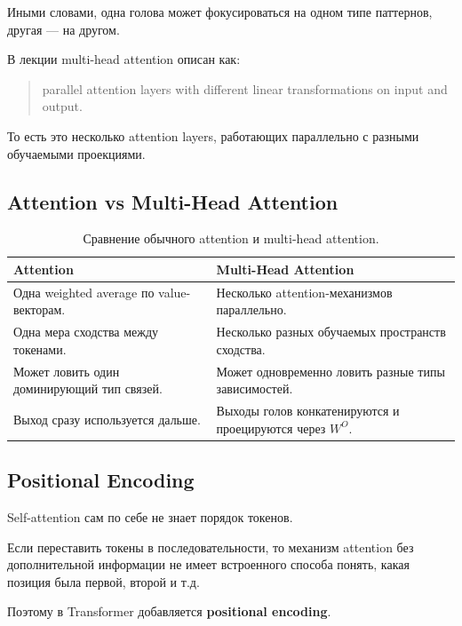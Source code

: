 \documentclass[a4paper,12pt]{article}
\begin{document}
Иными словами, одна голова может фокусироваться на одном типе паттернов, другая --- на другом.

В лекции multi-head attention описан как:

\begin{quote}
parallel attention layers with different linear transformations on input and output.
\end{quote}

То есть это несколько attention layers, работающих параллельно с разными обучаемыми проекциями.

\subsection{Attention vs Multi-Head Attention}

\begin{table}[H]
\centering
\begin{tabular}{p{} p{}}
\toprule
\textbf{Attention} & \textbf{Multi-Head Attention} \\
\midrule
Одна weighted average по value-векторам. &
Несколько attention-механизмов параллельно. \\

Одна мера сходства между токенами. &
Несколько разных обучаемых пространств сходства. \\

Может ловить один доминирующий тип связей. &
Может одновременно ловить разные типы зависимостей. \\

Выход сразу используется дальше. &
Выходы голов конкатенируются и проецируются через \(W^O\). \\
\bottomrule
\end{tabular}
\caption{Сравнение обычного attention и multi-head attention.}
\end{table}

\subsection{Positional Encoding}

Self-attention сам по себе не знает порядок токенов.

Если переставить токены в последовательности, то механизм attention без дополнительной информации не имеет встроенного способа понять, какая позиция была первой, второй и т.д.

Поэтому в Transformer добавляется \textbf{positional encoding}.
\end{document}
